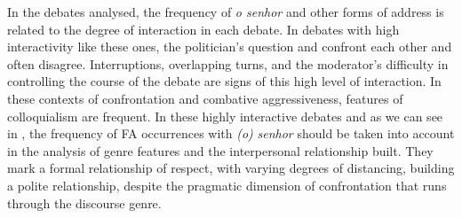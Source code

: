 \documentclass[output=paper]{langscibook}
\begin{document}
In the debates analysed, the frequency of \textit{o senhor} and other forms of address is related to the degree of interaction in each debate. In debates with high interactivity like these ones, the politician’s question and confront each other and often disagree. Interruptions, overlapping turns, and the moderator’s difficulty in controlling the course of the debate are signs of this high level of interaction. In these contexts of confrontation and combative aggressiveness, features of colloquialism are frequent. In these highly interactive debates and as we can see in , the frequency of FA occurrences with \textit{(o)} \textit{senhor} should be taken into account in the analysis of genre features and the interpersonal relationship built. They mark a formal relationship of respect, with varying degrees of distancing, building a polite relationship, despite the pragmatic dimension of confrontation that runs through the discourse genre.


\begin{table}
\caption{Occurrences of FA with \textit{senhor} in political debates}
\label{tab:marques:6}
\end{table}
\end{document}
